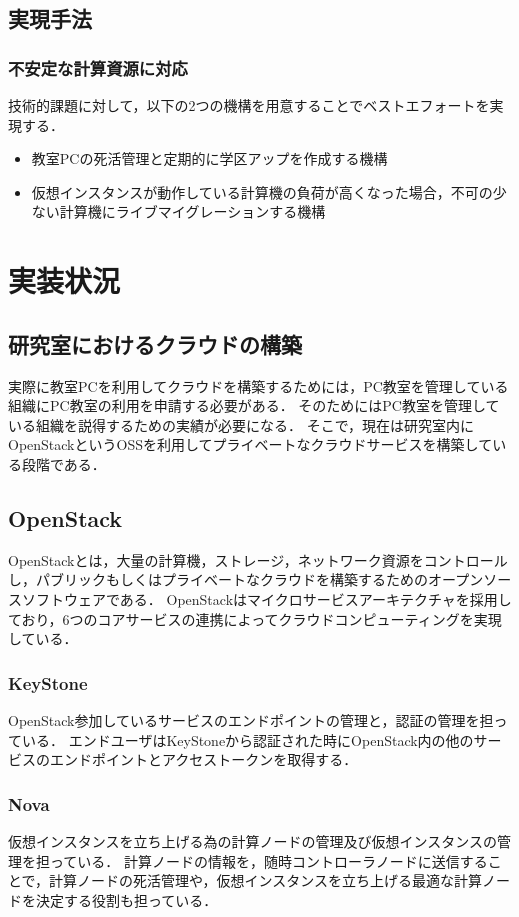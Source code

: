 \documentclass[11pt,a4paper]{jsarticle}
\begin{document}
\subsection{実現手法}
\subsubsection{不安定な計算資源に対応}
技術的課題に対して，以下の2つの機構を用意することでベストエフォートを実現する．
\begin{itemize}
	\item 教室PCの死活管理と定期的に学区アップを作成する機構
	\item 仮想インスタンスが動作している計算機の負荷が高くなった場合，不可の少ない計算機にライブマイグレーションする機構
\end{itemize}

\section{実装状況}
\subsection{研究室におけるクラウドの構築}
実際に教室PCを利用してクラウドを構築するためには，PC教室を管理している組織にPC教室の利用を申請する必要がある．
そのためにはPC教室を管理している組織を説得するための実績が必要になる．
そこで，現在は研究室内にOpenStackというOSSを利用してプライベートなクラウドサービスを構築している段階である．
\subsection{OpenStack}
OpenStackとは，大量の計算機，ストレージ，ネットワーク資源をコントロールし，パブリックもしくはプライベートなクラウドを構築するためのオープンソースソフトウェアである．
OpenStackはマイクロサービスアーキテクチャを採用しており，6つのコアサービスの連携によってクラウドコンピューティングを実現している．
\subsubsection{KeyStone}
OpenStack参加しているサービスのエンドポイントの管理と，認証の管理を担っている．
エンドユーザはKeyStoneから認証された時にOpenStack内の他のサービスのエンドポイントとアクセストークンを取得する．
\subsubsection{Nova}
仮想インスタンスを立ち上げる為の計算ノードの管理及び仮想インスタンスの管理を担っている．
計算ノードの情報を，随時コントローラノードに送信することで，計算ノードの死活管理や，仮想インスタンスを立ち上げる最適な計算ノードを決定する役割も担っている．
\end{document}
